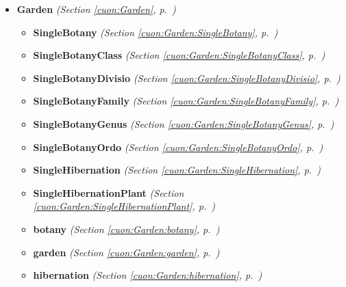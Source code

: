\begin{itemize}
\begin{itemize}
  \end{itemize}
\item \textbf{Garden}
  \textit{(Section \ref{cuon:Garden}, p.~\pageref{cuon:Garden})}

  \begin{itemize}
\setlength{\parskip}{0ex}
    \item \textbf{SingleBotany}
  \textit{(Section \ref{cuon:Garden:SingleBotany}, p.~\pageref{cuon:Garden:SingleBotany})}

    \item \textbf{SingleBotanyClass}
  \textit{(Section \ref{cuon:Garden:SingleBotanyClass}, p.~\pageref{cuon:Garden:SingleBotanyClass})}

    \item \textbf{SingleBotanyDivisio}
  \textit{(Section \ref{cuon:Garden:SingleBotanyDivisio}, p.~\pageref{cuon:Garden:SingleBotanyDivisio})}

    \item \textbf{SingleBotanyFamily}
  \textit{(Section \ref{cuon:Garden:SingleBotanyFamily}, p.~\pageref{cuon:Garden:SingleBotanyFamily})}

    \item \textbf{SingleBotanyGenus}
  \textit{(Section \ref{cuon:Garden:SingleBotanyGenus}, p.~\pageref{cuon:Garden:SingleBotanyGenus})}

    \item \textbf{SingleBotanyOrdo}
  \textit{(Section \ref{cuon:Garden:SingleBotanyOrdo}, p.~\pageref{cuon:Garden:SingleBotanyOrdo})}

    \item \textbf{SingleHibernation}
  \textit{(Section \ref{cuon:Garden:SingleHibernation}, p.~\pageref{cuon:Garden:SingleHibernation})}

    \item \textbf{SingleHibernationPlant}
  \textit{(Section \ref{cuon:Garden:SingleHibernationPlant}, p.~\pageref{cuon:Garden:SingleHibernationPlant})}

    \item \textbf{botany}
  \textit{(Section \ref{cuon:Garden:botany}, p.~\pageref{cuon:Garden:botany})}

    \item \textbf{garden}
  \textit{(Section \ref{cuon:Garden:garden}, p.~\pageref{cuon:Garden:garden})}

    \item \textbf{hibernation}
  \textit{(Section \ref{cuon:Garden:hibernation}, p.~\pageref{cuon:Garden:hibernation})}


\end{itemize}
\end{itemize}
